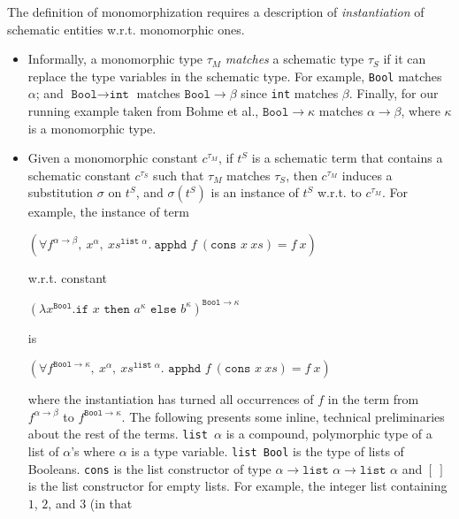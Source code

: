 \documentclass{article}
\begin{document}
	The definition of monomorphization 
	requires a description of 
	\textit{instantiation} of schematic 
	entities w.r.t. 
	monomorphic ones.
	\begin{itemize}
		\item Informally, a monomorphic type 
		$\tau_M$ \textit{matches} a schematic 
		type $\tau_S$ if it can replace the 
		type variables in the schematic 
		type. For example, \texttt{Bool} 
		matches $\alpha$; and $\texttt{Bool} 
		\to \texttt{int}$ matches 
		$\texttt{Bool} \to \beta$
		since \texttt{int} matches 
		$\beta$. Finally, for our running 
		example taken from Bohme et al., 
		${\texttt{Bool} \to \kappa}$
		matches $\alpha \to \beta$,
		where $\kappa$ is a monomorphic
		type. 
		
		\item Given a monomorphic constant 
		$c^{\tau_M}$,  if $t^S$ is a 
		schematic term that contains a 
		schematic constant $c^{\tau_S}$ 
		such that $\tau_M$ matches 
		$\tau_S$, then $c^{\tau_M}$ induces 
		a substitution $\sigma$ on $t^S$, 
		and $\sigma(t^S)$ is an instance of 
		$t^S$ w.r.t. to $c^{\tau_M}$. 
		For example, the instance of term
		\begin{center}
			$(\forall f^{\alpha \to \beta},\ 
			x^{\alpha},\ xs^{\texttt{list }
				\alpha}.\ \texttt{apphd }f\ 
			(\texttt{cons }x\ xs) = f\ x)$
		\end{center} 
		w.r.t. constant
		\begin{center}
			$(\lambda x^{\texttt{Bool}}.
			\texttt{if }x\texttt{ then }
			a^{\kappa} \texttt{ else }
			b^{\kappa})^{\texttt{Bool} \to 
				\kappa}$ 
		\end{center}
		is
		\begin{center}
			$(\forall f^{\texttt{Bool} 
				\to \kappa},\ x^{\alpha},\ 
			xs^{\texttt{list }\alpha}. 
			\texttt{ apphd }f\ (\texttt{cons }
			x \ xs) = f\ x)$
		\end{center}
		where the instantiation 
		has turned all occurrences of $f$ 
		in the term from $f^{\alpha \to \beta}$ 
		to $f^{\texttt{Bool} \to \kappa}$.
		The following presents some inline, 
		technical preliminaries about 
		the rest of the terms.
		\texttt{list $\alpha$} is a compound,
		polymorphic type of a list of 
		$\alpha$'s where $\alpha$ is a type 
		variable. \texttt{list Bool} is the 
		type of lists of Booleans. \texttt{cons} 
		is the list constructor of type 
		$\alpha \to \texttt{list }\alpha \to 
		\texttt{list }\alpha$ and $[\ ]$ is 
		the list constructor for empty lists. 
		For example, the integer list 
		containing $1$, $2$, and $3$ (in that 

\end{itemize}
\end{document}
